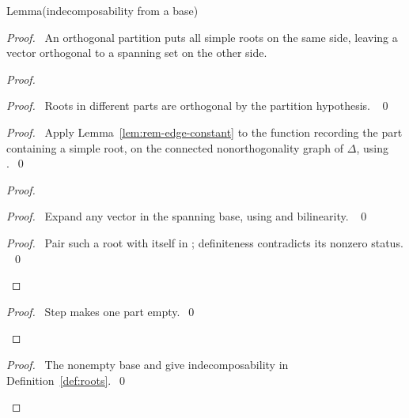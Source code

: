 \begin{namedresult}{Lemma}{(indecomposability from a base)}\label{lem:rem-base-connected}
\end{namedresult}
\begin{proof}
\pfsketch\ An orthogonal partition puts all simple roots on the same
side, leaving a vector orthogonal to a spanning set on the other side.
\begin{proof}
\begin{proof}\pf\ Roots in different parts are orthogonal by the partition
hypothesis. ~\qed\end{proof}
\begin{proof}\pf\ Apply
Lemma~\ref{lem:rem-edge-constant} to the function recording the part
containing a simple root, on the connected nonorthogonality graph
of $\Delta$, using .~\qed\end{proof}
\begin{proof}
\begin{proof}\pf\ Expand any vector in the spanning base, using
 and bilinearity. ~\qed\end{proof}
\qedstep
\begin{proof}\pf\ Pair such a root with itself in ;
definiteness contradicts its nonzero status. ~\qed\end{proof}
\end{proof}
\qedstep
\begin{proof}\pf\ Step  makes one part empty.~\qed\end{proof}
\end{proof}
\qedstep
\begin{proof}\pf\ The nonempty base and 
give indecomposability in Definition~\ref{def:roots}.~\qed\end{proof}
\end{proof}

